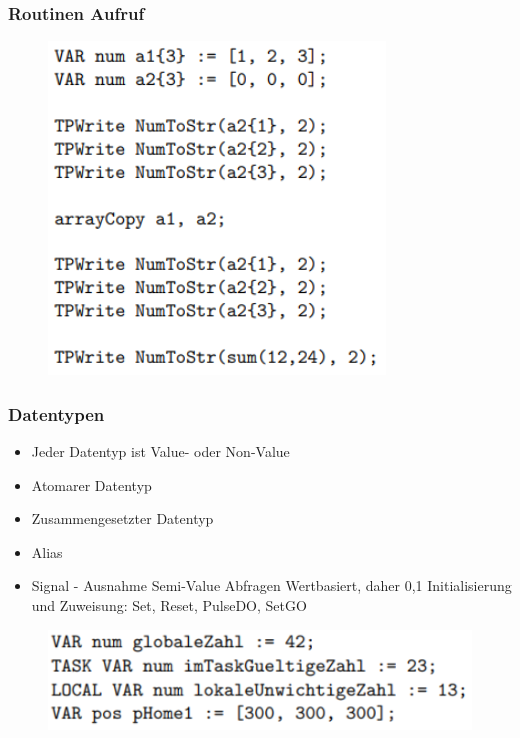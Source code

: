 \subsubsection{Routinen Aufruf}
\begin{figure}[H]
	\begin{center}
		\includegraphics[scale=0.9]{Resources/PNG/Syntax7.PNG}
		\caption{}
		\label{fig:PNG/Syntax7.PNG}
	\end{center}
\end{figure}
\subsubsection{Datentypen}
\begin{itemize}
	\item Jeder Datentyp ist Value- oder Non-Value
	\item Atomarer Datentyp
	\item Zusammengesetzter Datentyp
	\item Alias
	\item Signal - Ausnahme Semi-Value
	\subitem Abfragen Wertbasiert, daher 0,1
	\subitem Initialisierung und Zuweisung: Set, Reset, PulseDO, SetGO
\end{itemize}
\begin{figure}[H]
	\begin{center}
		\includegraphics{Resources/PNG/Syntax8.PNG}
		\caption{}
		\label{fig:PNG/Syntax8.PNG}
	\end{center}
\end{figure}

